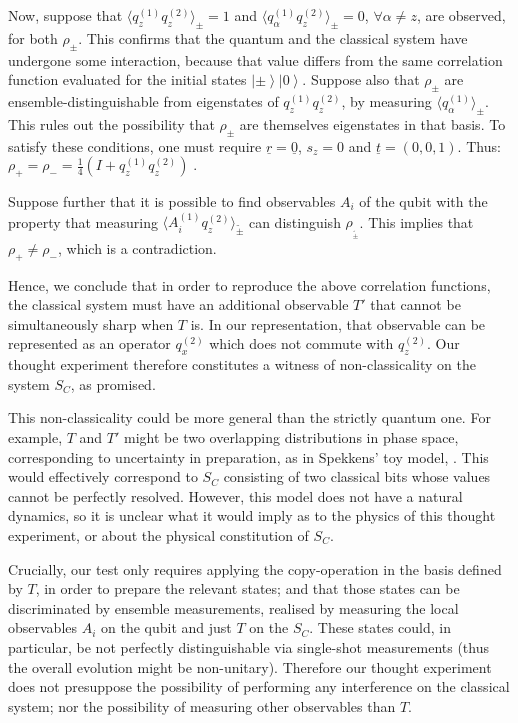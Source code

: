 \documentclass[prl,twocolumn,showpacs,preprintnumbers,amsmath,amssymb]{revtex4}
\newcommand{\ket}[1]{\left | #1 \right\rangle}
\begin{document}
Now, suppose that $\langle q_z^{(1)}q_z^{(2)}\rangle_{\pm}=1$ and $\langle q_{\alpha}^{(1)}q_z^{(2)}\rangle_{\pm}=0$, $\forall \alpha\neq z$, are observed, for both $\rho_{\pm}$. This confirms that the quantum and the classical system have undergone some interaction, because that value differs from the same correlation function evaluated for the initial states $\ket{\pm}\ket{0}$. Suppose also that $\rho_{\pm}$ are ensemble-distinguishable from eigenstates of $q_z^{(1)}q_z^{(2)}$, by measuring $\langle q_{\alpha}^{(1)}\rangle_{\pm}$. This rules out the possibility that $\rho_{\pm}$ are themselves eigenstates in that basis. To satisfy these conditions, one must require $\underline{r}=\underline{0}$, $s_z=0$ and $\underline{t}=(0,0,1)$. Thus: $\rho_+=\rho_-=\frac{1}{4} \left ( I + q_z^{(1)} q_z^{(2)}\right)\;.$ 

Suppose further that it is possible to find observables $A_i$ of the qubit with the property that measuring $\langle A_i^{(1)}q_z^{(2)}\rangle_{\tilde\pm}$ can distinguish $\rho_{_{\tilde\pm}}$. This implies that $\rho_+\neq\rho_-$, which is a contradiction. 

Hence, we conclude that in order to reproduce the above correlation functions, the classical system must have an additional observable $T'$ that cannot be simultaneously sharp when $T$ is. In our representation,  that observable can be represented as an operator $q_x^{(2)}$ which does not commute with $q_z^{(2)}$. Our thought experiment therefore constitutes a witness of non-classicality on the system $S_C$, as promised. 

This non-classicality could be more general than the strictly quantum one. For example, $T$ and $T'$ might be two overlapping distributions in phase space, corresponding to uncertainty in preparation, as in Spekkens' toy model, \cite{SPEK}. This would effectively correspond to $S_C$ consisting of two classical bits whose values cannot be perfectly resolved. However, this model does not have a natural dynamics, so it is unclear what it would imply as to the physics of this thought experiment, or about the physical constitution of $S_C$. 

Crucially, our test only requires applying the copy-operation in the basis defined by $T$, in order to prepare the relevant states; and that those states can be discriminated by {ensemble measurements}, realised by measuring the local observables $A_i$ on the qubit and just $T$ on the $S_C$. These states could, in particular, be not perfectly distinguishable via single-shot measurements (thus the overall evolution might be non-unitary). Therefore our thought experiment does not presuppose the possibility of performing any interference on the classical system; nor the possibility of measuring other observables than $T$.
\end{document}

